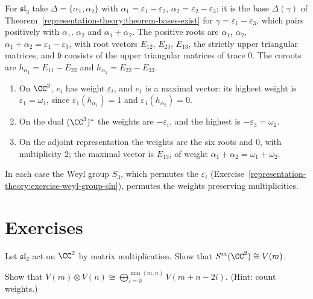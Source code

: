 \begin{example}\label{representation-theory:example-sl3-weights}
For $\mathfrak{sl}_3$ take $\Delta = \{\alpha_1, \alpha_2\}$ with $\alpha_1 = \varepsilon_1 - \varepsilon_2$, $\alpha_2 = \varepsilon_2 - \varepsilon_3$; it is the base $\Delta(\gamma)$ of
Theorem~\ref{representation-theory:theorem-bases-exist} for $\gamma = \varepsilon_1 - \varepsilon_3$, which pairs positively with $\alpha_1$, $\alpha_2$ and $\alpha_1 + \alpha_2$. The positive roots are $\alpha_1$, $\alpha_2$,
$\alpha_1 + \alpha_2 = \varepsilon_1 - \varepsilon_3$, with root vectors $E_{12}$, $E_{23}$, $E_{13}$, the strictly upper triangular matrices, and $\mathfrak{b}$ consists of the upper
triangular matrices of trace $0$. The coroots are $h_{\alpha_1} = E_{11} - E_{22}$ and $h_{\alpha_2} = E_{22} - E_{33}$.
\begin{enumerate}
\item On $\CC^3$, $e_i$ has weight $\varepsilon_i$, and $e_1$ is a maximal vector: its highest weight is $\varepsilon_1 = \omega_1$, since $\varepsilon_1(h_{\alpha_1}) = 1$ and
$\varepsilon_1(h_{\alpha_2}) = 0$.
\item On the dual $(\CC^3)^*$ the weights are $-\varepsilon_i$, and the highest is $-\varepsilon_3 = \omega_2$.
\item On the adjoint representation the weights are the six roots and $0$, with multiplicity $2$; the maximal vector is $E_{13}$, of weight $\alpha_1 + \alpha_2 = \omega_1 + \omega_2$.
\end{enumerate}
In each case the Weyl group $S_3$, which permutes the $\varepsilon_i$ (Exercise~\ref{representation-theory:exercise-weyl-group-sln}), permutes the weights preserving multiplicities.
\end{example}
\section{Exercises}\label{representation-theory:section-exercises}

\begin{exercise}\label{representation-theory:exercise-symmetric-powers}
Let $\mathfrak{sl}_2$ act on $\CC^2$ by matrix multiplication. Show that $S^m(\CC^2) \cong V(m)$.
\end{exercise}

\begin{exercise}\label{representation-theory:exercise-clebsch-gordan}
Show that $V(m) \otimes V(n) \cong \bigoplus_{i=0}^{\min(m,n)} V(m + n - 2i)$. (Hint: count weights.)
\end{exercise}

